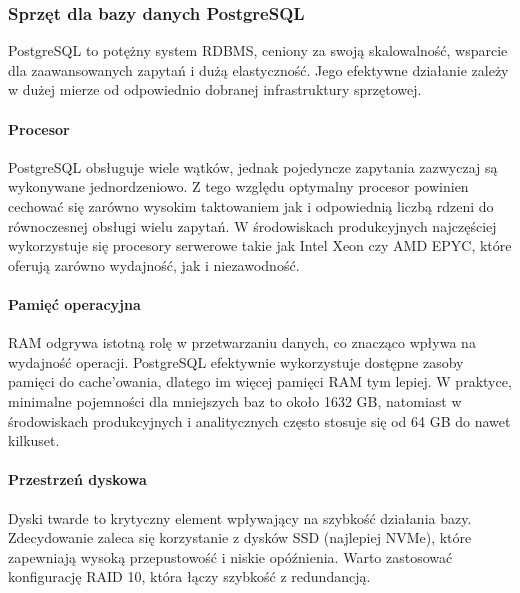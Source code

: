 \documentclass[letterpaper,10pt,polish]{sphinxmanual}
\begin{document}
\subsubsection{Sprzęt dla bazy danych PostgreSQL}
\label{\detokenize{rozdzial2/Sprzet-dla-bazy-danych/source/SprzetDlaBazyDanych:sprzet-dla-bazy-danych-postgresql}}
\sphinxAtStartPar
PostgreSQL to potężny system RDBMS, ceniony za swoją skalowalność, wsparcie dla zaawansowanych zapytań i dużą elastyczność. Jego efektywne działanie zależy w dużej mierze od odpowiednio dobranej infrastruktury sprzętowej.


\paragraph{Procesor}
\label{\detokenize{rozdzial2/Sprzet-dla-bazy-danych/source/SprzetDlaBazyDanych:procesor}}
\sphinxAtStartPar
PostgreSQL obsługuje wiele wątków, jednak pojedyncze zapytania zazwyczaj są wykonywane jednordzeniowo. Z tego względu optymalny procesor powinien cechować się zarówno wysokim taktowaniem jak i odpowiednią liczbą rdzeni do równoczesnej obsługi wielu zapytań. W środowiskach produkcyjnych najczęściej wykorzystuje się procesory serwerowe takie jak Intel Xeon czy AMD EPYC, które oferują zarówno wydajność, jak i niezawodność.


\paragraph{Pamięć operacyjna}
\label{\detokenize{rozdzial2/Sprzet-dla-bazy-danych/source/SprzetDlaBazyDanych:pamiec-operacyjna}}
\sphinxAtStartPar
RAM odgrywa istotną rolę w przetwarzaniu danych, co znacząco wpływa na wydajność operacji. PostgreSQL efektywnie wykorzystuje dostępne zasoby pamięci do cache’owania, dlatego im więcej pamięci RAM tym lepiej. W praktyce, minimalne pojemności dla mniejszych baz to około 16\textendash{}32 GB, natomiast w środowiskach produkcyjnych i analitycznych często stosuje się od 64 GB do nawet kilkuset.


\paragraph{Przestrzeń dyskowa}
\label{\detokenize{rozdzial2/Sprzet-dla-bazy-danych/source/SprzetDlaBazyDanych:przestrzen-dyskowa}}
\sphinxAtStartPar
Dyski twarde to krytyczny element wpływający na szybkość działania bazy. Zdecydowanie zaleca się korzystanie z dysków SSD (najlepiej NVMe), które zapewniają wysoką przepustowość i niskie opóźnienia. Warto zastosować konfigurację RAID 10, która łączy szybkość z redundancją.
\end{document}
